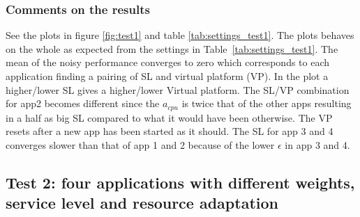 \documentclass[nobiblatex]{LTHthesis}
\begin{document}
\subsubsection{Comments on the results}
See the plots in figure \ref{fig:test1} and table \ref{tab:settings_test1}.
The plots behaves on the whole as expected from the settings in 
Table~\ref{tab:settings_test1}.
The mean of the noisy performance converges to zero which corresponds to each 
application finding a pairing of SL and virtual platform (VP). In the plot a 
higher/lower SL gives a higher/lower Virtual platform. The SL/VP combination
for app2 becomes different since the $a_{cpu}$ is twice that of the other apps 
resulting in a half as big SL compared to what it would have been otherwise. 
The VP resets after a new app has been started as it should. The SL for app 
3 and 4 converges slower than that of app 1 and 2 because of the lower
$\epsilon$ in app 3 and 4.

\subsection{Test 2: four applications with different weights, 
  service level and resource adaptation}
\end{document}
